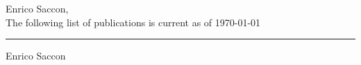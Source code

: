 \documentclass[10pt,a4paper,sans]{article}
\begin{document}
\pagestyle{empty}

\begin{center}
  \Large{Enrico Saccon,}\\
  \Large{The following list of publications is current as of \today}
\end{center}

\nocite{*}
\printbibliography[heading=none]

\vfill
\begin{flushright}
  \begin{minipage}{0.4\paperwidth}
   \rule{.4\paperwidth}{0.4pt}
   Enrico Saccon
  \end{minipage}
\end{flushright}
\end{document}
